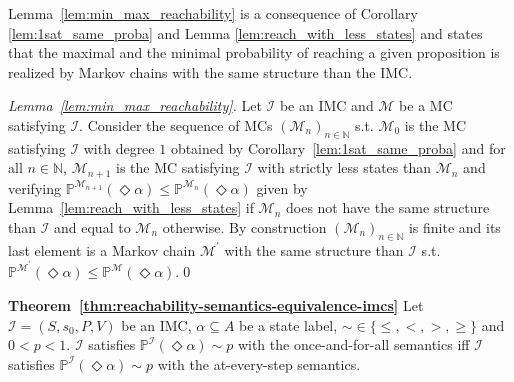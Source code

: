 \documentclass{llncs}
\newcommand{\mc}{\textnormal{MC}}
\newcommand{\imc}{\textnormal{IMC}}
\newcommand{\Nset}             {\ensuremath{\mathbb{N}}}
\newcommand{\Proba}            {\ensuremath{\mathbb{P}}}
\newcommand{\ltlExists}{\ensuremath{\Diamond}}
\begin{document}
Lemma~\ref{lem:min_max_reachability} is a consequence of Corollary \ref{lem:1sat_same_proba} and Lemma \ref{lem:reach_with_less_states} and
states that the maximal and the minimal probability of reaching a given proposition
is realized by Markov chains with the same structure than the {\imc}.

\begin{proof}[Lemma~\ref{lem:min_max_reachability}]
Let $\mathcal{I}$ be an {\imc} and $\mathcal{M}$ be a {\mc} satisfying $\mathcal{I}$.
Consider the sequence of {\mc}s $(\mathcal{M}_n)_{n \in \Nset}$ s.t.
$\mathcal{M}_0$ is the {\mc} satisfying $\mathcal{I}$ with degree $1$ obtained by Corollary~\ref{lem:1sat_same_proba}
and for all $n \in \Nset$, $\mathcal{M}_{n+1}$ is the {\mc} satisfying $\mathcal{I}$ with strictly less states than $\mathcal{M}_{n}$ and verifying 
$\Proba^{\mathcal{M}_{n+1}}(\ltlExists \alpha) \leq \Proba^{\mathcal{M}_{n}}(\ltlExists \alpha)$ 
given by Lemma~\ref{lem:reach_with_less_states} if
$\mathcal{M}_{n}$ does not have the same structure than $\mathcal{I}$ 
and equal to $\mathcal{M}_{n}$ otherwise.
By construction $(\mathcal{M}_n)_{n \in \Nset}$ is finite and its last element
is a Markov chain $\mathcal{M}^\prime$ with the same structure than $\mathcal{I}$
s.t. $\Proba^{\mathcal{M}^\prime}(\ltlExists \alpha) \leq \Proba^{\mathcal{M}}(\ltlExists \alpha)$.\qed
\end{proof}

\begin{paragraph}{\textnormal{\textbf{Theorem~\ref{thm:reachability-semantics-equivalence-imcs}}}}
	Let $\mathcal{I} = (S,s_0,P,V)$ be an {\imc}, $\alpha
        \subseteq A$ be a state label, ${\sim} \in \{\le,<,>,\ge\}$
        and $0<p<1$. $\mathcal{I}$ satisfies
        $\mathbb{P}^{\mathcal{I}}(\ltlExists \alpha) {\sim} p$ with
        the once-and-for-all semantics iff $\mathcal{I}$ satisfies
        $\mathbb{P}^{\mathcal{I}}(\ltlExists \alpha) {\sim} p$ with
        the at-every-step semantics.

\end{paragraph}
\end{document}
